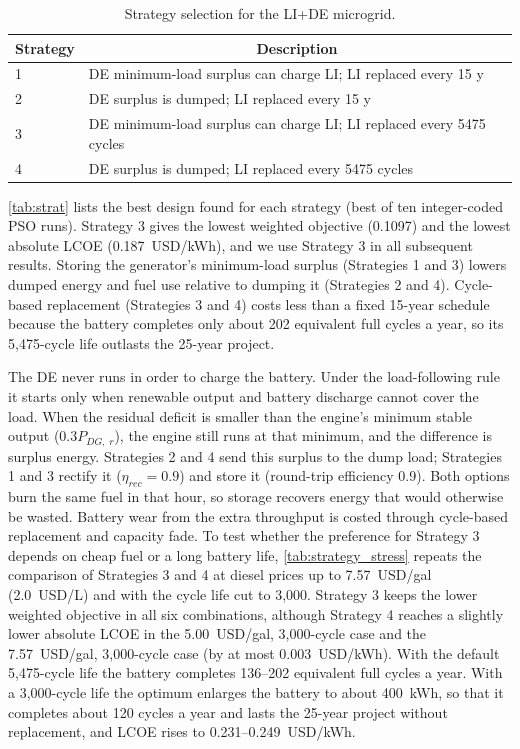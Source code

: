 \documentclass[final,3p,times]{elsarticle}
\begin{document}
\begin{table}[htbp] 
\centering
\begin{tabular}{p{0.75cm} p{10cm}}
\toprule
\multicolumn{1}{c}{\textbf{Strategy}} & \multicolumn{1}{c}{\textbf{Description}}    \\
\midrule
1 & DE minimum-load surplus can charge LI; LI replaced every 15 y \\[1ex]
2 & DE surplus is dumped; LI replaced every 15 y \\[1ex]
3 & DE minimum-load surplus can charge LI; LI replaced every 5475 cycles \\[1ex]
4 & DE surplus is dumped; LI replaced every 5475 cycles \\
\bottomrule
\end{tabular}
\caption{Strategy selection for the LI+DE microgrid.}
\label{tab:strat_select} 
\end{table}

\cref{tab:strat} lists the best design found for each strategy (best of ten integer-coded PSO runs). Strategy 3 gives the lowest weighted objective (0.1097) and the lowest absolute LCOE (0.187~USD/kWh), and we use Strategy 3 in all subsequent results. Storing the generator's minimum-load surplus (Strategies 1 and 3) lowers dumped energy and fuel use relative to dumping it (Strategies 2 and 4). Cycle-based replacement (Strategies 3 and 4) costs less than a fixed 15-year schedule because the battery completes only about 202 equivalent full cycles a year, so its 5,475-cycle life outlasts the 25-year project.

The DE never runs in order to charge the battery. Under the load-following rule it starts only when renewable output and battery discharge cannot cover the load. When the residual deficit is smaller than the engine's minimum stable output ($0.3P_{DG,\;r}$), the engine still runs at that minimum, and the difference is surplus energy. Strategies 2 and 4 send this surplus to the dump load; Strategies 1 and 3 rectify it ($\eta_{rec} = 0.9$) and store it (round-trip efficiency 0.9). Both options burn the same fuel in that hour, so storage recovers energy that would otherwise be wasted. Battery wear from the extra throughput is costed through cycle-based replacement and capacity fade. To test whether the preference for Strategy 3 depends on cheap fuel or a long battery life, \cref{tab:strategy_stress} repeats the comparison of Strategies 3 and 4 at diesel prices up to 7.57~USD/gal (2.0~USD/L) and with the cycle life cut to 3,000. Strategy 3 keeps the lower weighted objective in all six combinations, although Strategy 4 reaches a slightly lower absolute LCOE in the 5.00~USD/gal, 3,000-cycle case and the 7.57~USD/gal, 3,000-cycle case (by at most 0.003~USD/kWh). With the default 5,475-cycle life the battery completes 136--202 equivalent full cycles a year. With a 3,000-cycle life the optimum enlarges the battery to about 400~kWh, so that it completes about 120 cycles a year and lasts the 25-year project without replacement, and LCOE rises to 0.231--0.249~USD/kWh.
\end{document}
